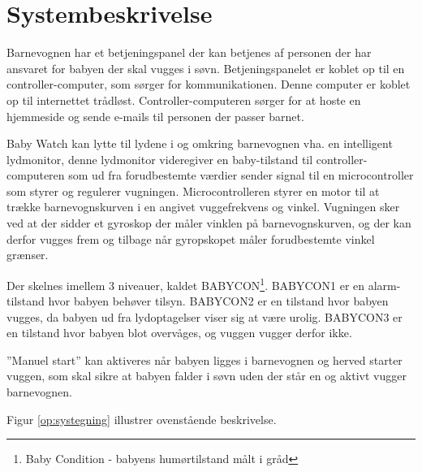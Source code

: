 \chapter{Systembeskrivelse}

Barnevognen har et betjeningspanel der kan betjenes af personen der har ansvaret for babyen der skal vugges i søvn. Betjeningspanelet er koblet op til en controller-computer, som sørger for kommunikationen. Denne computer er koblet op til internettet trådløst. Controller-computeren sørger for at hoste en hjemmeside og sende e-mails til personen der passer barnet.

Baby Watch kan lytte til lydene i og omkring barnevognen vha. en intelligent lydmonitor, denne lydmonitor videregiver en baby-tilstand til controller-computeren som ud fra forudbestemte værdier sender signal til en microcontroller som styrer og regulerer vugningen. Microcontrolleren styrer en motor til at trække barnevognskurven i en angivet vuggefrekvens og vinkel. Vugningen sker ved at der sidder et gyroskop der måler vinklen på barnevognskurven, og der kan derfor vugges frem og tilbage når gyropskopet måler forudbestemte vinkel grænser.

Der skelnes imellem 3 niveauer, kaldet BABYCON\footnote{Baby Condition - babyens humørtilstand målt i gråd}. BABYCON1 er en alarm-tilstand hvor babyen behøver tilsyn. BABYCON2 er en tilstand hvor babyen vugges, da babyen ud fra lydoptagelser viser sig at være urolig. BABYCON3 er en tilstand hvor babyen blot overvåges, og vuggen vugger derfor ikke. 

''Manuel start'' kan aktiveres når babyen ligges i barnevognen og herved starter vuggen, som skal sikre at babyen falder i søvn uden der står en og aktivt vugger barnevognen. 

Figur \ref{op:systegning} illustrer ovenstående beskrivelse. 

